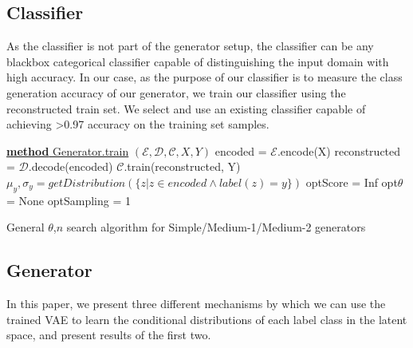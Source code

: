 \documentclass{article}
\begin{document}
\subsection{Classifier}

As the classifier is not part of the generator setup, the classifier can be any blackbox categorical classifier capable of distinguishing the input domain with high accuracy. In our case, as the purpose of our classifier is to measure the class generation accuracy of our generator, we train our classifier using the reconstructed train set. We select and use an existing classifier capable of achieving >0.97 accuracy on the training set samples.

\begin{algorithm}

    \underline{\textbf{method} Generator.train} $(\mathcal{E}, \mathcal{D}, \mathcal{C}, X, Y)$\;
    encoded = $\mathcal{E}$.encode(X)\;
    reconstructed = $\mathcal{D}$.decode(encoded)\;
    $\mathcal{C}$.train(reconstructed, Y)\;
     {
    	$\mu_y, \sigma_y = getDistribution(\{z | z \in encoded \wedge label(z)= y\})$\;
    }
    optScore = Inf\;
    opt$\theta$ = None\;
    optSampling = 1\;
    \caption{General $\theta$,$n$ search algorithm for Simple/Medium-1/Medium-2 generators}
\end{algorithm}

\subsection{Generator}
In this paper, we present three different mechanisms by which we can use the trained VAE to learn the conditional distributions of each label class in the latent space, and present results of the first two.
\end{document}
